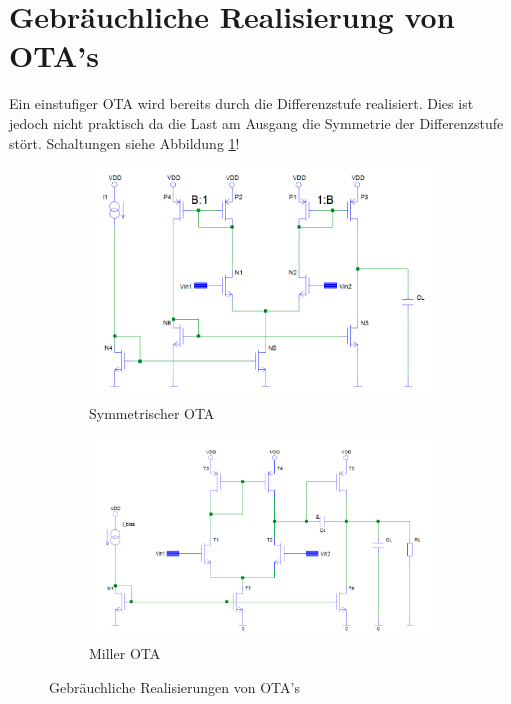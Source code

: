 \newpage

\section{Gebräuchliche Realisierung von OTA's}
Ein einstufiger OTA wird bereits durch die Differenzstufe realisiert. Dies ist jedoch nicht praktisch da die Last am
Ausgang die Symmetrie der Differenzstufe stört.
Schaltungen siehe Abbildung \ref{fig:otas}!
\begin{figure}[htp]
\begin{center}
	\begin{subfigure}[b]{0.49\linewidth}
		\centering
		\includegraphics[width=0.9\linewidth]{images/SymetrischerOTA.png}
		\caption{Symmetrischer OTA}
	\end{subfigure}
	\begin{subfigure}[b]{0.49\linewidth}
		\centering
		\includegraphics[width=0.9\linewidth]{images/millerOTA.png}
		\caption{Miller OTA}
	\end{subfigure}
	\caption{Gebräuchliche Realisierungen von OTA's}
	\label{fig:otas}
\end{center}
\end{figure}

